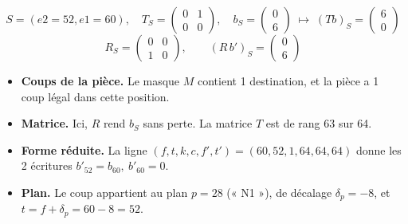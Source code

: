 \[ S = (e2=52, e1=60),\quad T_S = \begin{pmatrix}0 & 1 \\ 0 & 0\end{pmatrix},\quad b_S = \begin{pmatrix}0 \\ 6\end{pmatrix}\;\longmapsto\; (Tb)_S =\begin{pmatrix}6 \\ 0\end{pmatrix} \]
\[ R_S = \begin{pmatrix}0 & 0 \\ 1 & 0\end{pmatrix},\qquad (R\,b')_S = \begin{pmatrix}0 \\ 6\end{pmatrix} \]
\begin{itemize}
\item \textbf{Coups de la pièce.} Le masque $M$ contient 1 destination, et la pièce a 1 coup légal dans cette position.
\item \textbf{Matrice.} Ici, $R$ rend $b_S$ sans perte. La matrice $T$ est de rang 63 sur 64.
\item \textbf{Forme réduite.} La ligne $(f, t, k, c, f', t') = (60, 52, 1, 64, 64, 64)$ donne les 2 écritures $b'_{52} = b_{60},\ b'_{60} = 0$.
\item \textbf{Plan.} Le coup appartient au plan $p = 28$ (« N1 »), de décalage $\delta_p = -8$, et $t = f + \delta_p = 60 -8 = 52$.
\end{itemize}
